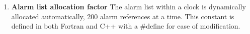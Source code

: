 
\begin{enumerate}

\item {\bf Alarm list allocation factor}  The alarm list within a clock is
dynamically allocated automatically, 200 alarm references at a time.
This constant is defined in both Fortran and C++ with a \#define for ease
of modification.

\end{enumerate}
